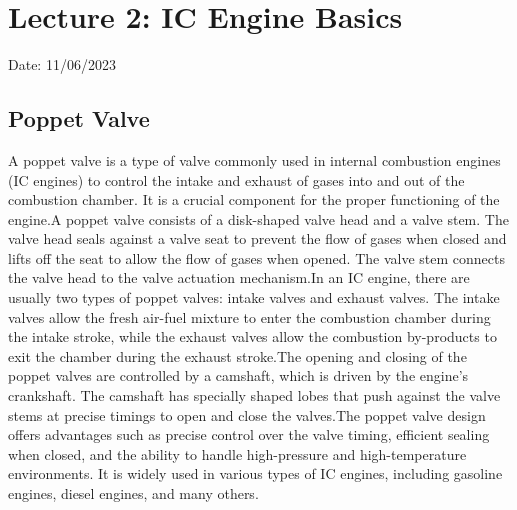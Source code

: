 \documentclass{article}
\begin{document}
\setlength{\fboxsep}{7pt} %
\setlength{\fboxrule}{1pt} %


\newpage
\section{Lecture 2: IC Engine Basics}
\hfill {Date: 11/06/2023}
\subsection*{Poppet Valve}
A poppet valve is a type of valve commonly used in internal combustion engines (IC engines) to control the intake and exhaust of gases into and out of the combustion chamber. It is a crucial component for the proper functioning of the engine.A poppet valve consists of a disk-shaped valve head and a valve stem. The valve head seals against a valve seat to prevent the flow of gases when closed and lifts off the seat to allow the flow of gases when opened. The valve stem connects the valve head to the valve actuation mechanism.In an IC engine, there are usually two types of poppet valves: intake valves and exhaust valves. The intake valves allow the fresh air-fuel mixture to enter the combustion chamber during the intake stroke, while the exhaust valves allow the combustion by-products to exit the chamber during the exhaust stroke.The opening and closing of the poppet valves are controlled by a camshaft, which is driven by the engine's crankshaft. The camshaft has specially shaped lobes that push against the valve stems at precise timings to open and close the valves.The poppet valve design offers advantages such as precise control over the valve timing, efficient sealing when closed, and the ability to handle high-pressure and high-temperature environments. It is widely used in various types of IC engines, including gasoline engines, diesel engines, and many others.
\end{document}
